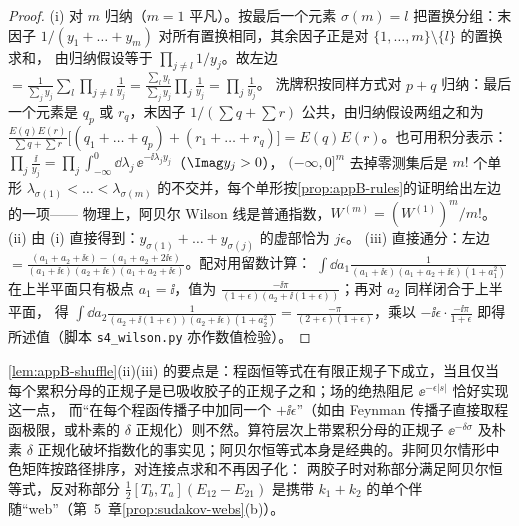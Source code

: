 \begin{proof}
(i) 对 $m$ 归纳（$m=1$ 平凡）。按最后一个元素 $\sigma(m)=l$ 把置换分组：末因子 $1/(y_1+\dots+y_m)$ 对所有置换相同，其余因子正是对 $\{1,\dots,m\}\setminus\{l\}$ 的置换求和，
由归纳假设等于 $\prod_{j\ne l}1/y_j$。故左边 $=\frac{1}{\sum_jy_j}\sum_l\prod_{j\ne l}\frac1{y_j}=\frac{\sum_ly_l}{\sum_jy_j}\prod_j\frac1{y_j}=\prod_j\frac1{y_j}$。
洗牌积按同样方式对 $p+q$ 归纳：最后一个元素是 $q_p$ 或 $r_q$，末因子 $1/(\sum q+\sum r)$ 公共，由归纳假设两组之和为
$\frac{E(q)E(r)}{\sum q+\sum r}\big[(q_1+\dots+q_p)+(r_1+\dots+r_q)\big]=E(q)E(r)$。也可用积分表示：$\prod_j\frac{\ii}{y_j}=\prod_j\int_{-\infty}^0\dd\lambda_j\,\ee^{-\ii\lambda_jy_j}$（$\Imag y_j>0$），
$(-\infty,0]^m$ 去掉零测集后是 $m!$ 个单形 $\lambda_{\sigma(1)}<\dots<\lambda_{\sigma(m)}$ 的不交并，每个单形按\cref{prop:appB-rules}的证明给出左边的一项——
物理上，阿贝尔 Wilson 线是普通指数，$W^{(m)}=(W^{(1)})^m/m!$。
(ii) 由 (i) 直接得到：$y_{\sigma(1)}+\dots+y_{\sigma(j)}$ 的虚部恰为 $j\epsilon$。
(iii) 直接通分：左边 $=\frac{(a_1+a_2+\ii\epsilon)-(a_1+a_2+2\ii\epsilon)}{(a_1+\ii\epsilon)(a_2+\ii\epsilon)(a_1+a_2+\ii\epsilon)}$。配对用留数计算：
$\int\dd a_1\frac{1}{(a_1+\ii\epsilon)(a_1+a_2+\ii\epsilon)(1+a_1^2)}$ 在上半平面只有极点 $a_1=\ii$，值为 $\frac{-\ii\pi}{(1+\epsilon)(a_2+\ii(1+\epsilon))}$；再对 $a_2$ 同样闭合于上半平面，
得 $\int\dd a_2\frac{1}{(a_2+\ii(1+\epsilon))(a_2+\ii\epsilon)(1+a_2^2)}=\frac{-\pi}{(2+\epsilon)(1+\epsilon)}$，乘以 $-\ii\epsilon\cdot\frac{-\ii\pi}{1+\epsilon}$ 即得所述值（脚本 \texttt{s4\_wilson.py} 亦作数值检验）。
\end{proof}

\cref{lem:appB-shuffle}(ii)(iii) 的要点是：程函恒等式在有限正规子下成立，当且仅当每个累积分母的正规子是已吸收胶子的正规子之和；场的绝热阻尼 $\ee^{-\epsilon|s|}$ 恰好实现这一点，
而“在每个程函传播子中加同一个 $+\ii\epsilon$”（如由 Feynman 传播子直接取程函极限，或朴素的 $\delta$ 正规化）则不然。算符层次上带累积分母的正规子 $\ee^{-\delta\sigma}$
及朴素 $\delta$ 正规化破坏指数化的事实见\cite[式~(5)--(6)]{Echevarria:2015byo}；阿贝尔恒等式本身是经典的。非阿贝尔情形中色矩阵按路径排序，对连接点求和不再因子化：
两胶子时对称部分满足阿贝尔恒等式，反对称部分 $\frac12[T_b,T_a](E_{12}-E_{21})$ 是携带 $k_1+k_2$ 的单个伴随“web”（第~5~章\cref{prop:sudakov-webs}(b)）。

